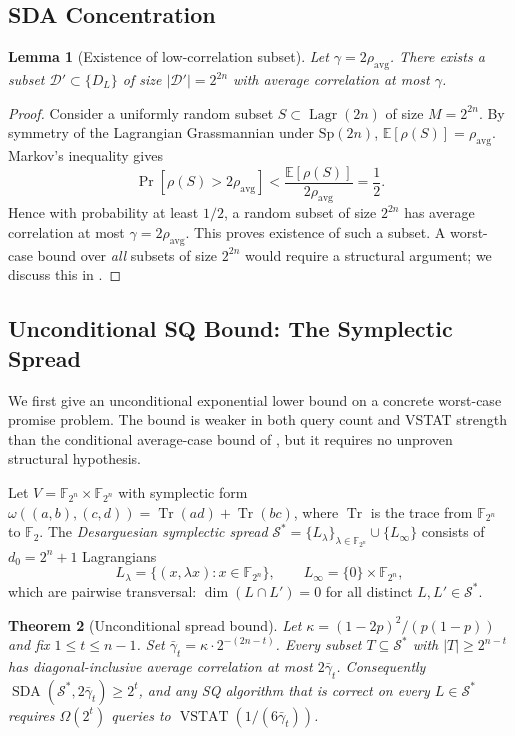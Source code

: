 \documentclass[11pt,a4paper]{article}
\theoremstyle{plain}
\newtheorem{theorem}{Theorem}[section]
\newtheorem{lemma}[theorem]{Lemma}
\theoremstyle{definition}
\newcommand{\F}{\mathbb{F}}
\newcommand{\E}{\mathbb{E}}
\DeclareMathOperator{\Lagr}{Lagr}
\DeclareMathOperator{\SDA}{SDA}
\DeclareMathOperator{\VSTAT}{VSTAT}
\begin{document}
\subsection{SDA Concentration}
\label{subsec:sda}

\begin{lemma}[Existence of low-correlation subset]
\label{lem:sda}
Let $\gamma = 2\rho_{\mathrm{avg}}$. There exists a subset $\mathcal{D}' \subset \{D_L\}$ of size $|\mathcal{D}'| = 2^{2n}$ with average correlation at most $\gamma$.
\end{lemma}

\begin{proof}
Consider a uniformly random subset $S \subset \Lagr(2n)$ of size $M = 2^{2n}$. By symmetry of the Lagrangian Grassmannian under $\mathrm{Sp}(2n)$, $\E[\rho(S)] = \rho_{\mathrm{avg}}$. Markov's inequality gives
\[
\Pr[\rho(S) > 2\rho_{\mathrm{avg}}] < \frac{\E[\rho(S)]}{2\rho_{\mathrm{avg}}} = \frac{1}{2}.
\]
Hence with probability at least $1/2$, a random subset of size $2^{2n}$ has average correlation at most $\gamma = 2\rho_{\mathrm{avg}}$. This proves existence of such a subset. A worst-case bound over \emph{all} subsets of size $2^{2n}$ would require a structural argument; we discuss this in .
\end{proof}

\subsection{Unconditional SQ Bound: The Symplectic Spread}
\label{subsec:spread-bound}

We first give an unconditional exponential lower bound on a concrete worst-case promise problem. The bound is weaker in both query count and VSTAT strength than the conditional average-case bound of , but it requires no unproven structural hypothesis.

Let $V = \F_{2^n} \times \F_{2^n}$ with symplectic form $\omega((a,b),(c,d)) = \operatorname{Tr}(ad) + \operatorname{Tr}(bc)$, where $\operatorname{Tr}$ is the trace from $\F_{2^n}$ to $\F_2$. The \emph{Desarguesian symplectic spread} $\mathcal{S}^* = \{L_\lambda\}_{\lambda \in \F_{2^n}} \cup \{L_\infty\}$ consists of $d_0 = 2^n+1$ Lagrangians
\[
L_\lambda = \{(x, \lambda x) : x \in \F_{2^n}\}, \qquad L_\infty = \{0\} \times \F_{2^n},
\]
which are pairwise transversal: $\dim(L \cap L') = 0$ for all distinct $L, L' \in \mathcal{S}^*$.

\begin{theorem}[Unconditional spread bound]
\label{thm:main-sq-uncond}
Let $\kappa = (1-2p)^2/(p(1-p))$ and fix $1 \leq t \leq n-1$. Set $\bar\gamma_t = \kappa \cdot 2^{-(2n-t)}$. Every subset $T \subseteq \mathcal{S}^*$ with $|T| \geq 2^{n-t}$ has diagonal-inclusive average correlation at most $2\bar\gamma_t$. Consequently $\SDA(\mathcal{S}^*, 2\bar\gamma_t) \geq 2^t$, and any SQ algorithm that is correct on every $L \in \mathcal{S}^*$ requires $\Omega(2^t)$ queries to $\VSTAT(1/(6\bar\gamma_t))$.
\end{theorem}
\end{document}
